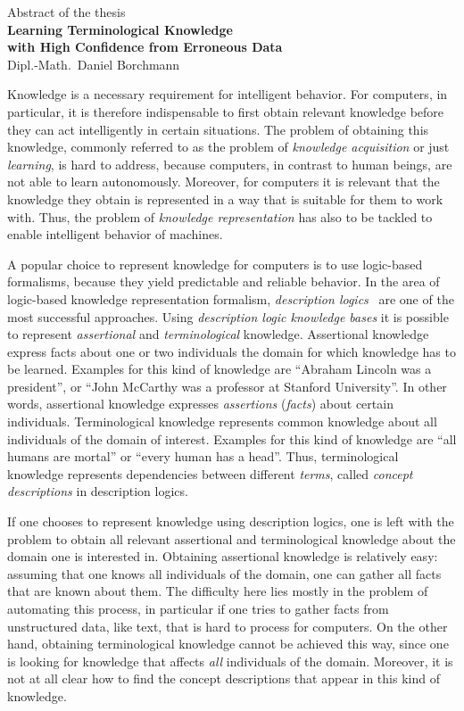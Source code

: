 \documentclass[english,fleqn]{scrartcl}
\begin{document}
\medskip
\begin{center}
  \normalsize Abstract of the thesis\\
  \LARGE\textbf{Learning Terminological Knowledge\\ with High Confidence from Erroneous
    Data}\\
  \bigskip%
  \large Dipl.-Math.\ Daniel Borchmann
\end{center}
\bigskip
\bigskip

\noindent
Knowledge is a necessary requirement for intelligent behavior.  For computers, in
particular, it is therefore indispensable to first obtain relevant knowledge before they
can act intelligently in certain situations.  The problem of obtaining this knowledge,
commonly referred to as the problem of \emph{knowledge acquisition} or just
\emph{learning}, is hard to address, because computers, in contrast to human beings, are
not able to learn autonomously.  Moreover, for computers it is relevant that the knowledge
they obtain is represented in a way that is suitable for them to work with.  Thus, the
problem of \emph{knowledge representation} has also to be tackled to enable intelligent
behavior of machines.

A popular choice to represent knowledge for computers is to use logic-based formalisms,
because they yield predictable and reliable behavior.  In the area of logic-based
knowledge representation formalism, \emph{description logics}~\cite{DLhandbook} are one of
the most successful approaches.  Using \emph{description logic knowledge bases} it is
possible to represent \emph{assertional} and \emph{terminological} knowledge.  Assertional
knowledge express facts about one or two individuals the domain for which knowledge has to
be learned.  Examples for this kind of knowledge are \enquote{Abraham Lincoln was a
  president}, or \enquote{John McCarthy was a professor at Stanford University}.  In other
words, assertional knowledge expresses \emph{assertions} (\emph{facts}) about certain
individuals.  Terminological knowledge represents common knowledge about all individuals
of the domain of interest.  Examples for this kind of knowledge are \enquote{all humans
  are mortal} or \enquote{every human has a head}.  Thus, terminological knowledge
represents dependencies between different \emph{terms}, called \emph{concept
  descriptions} in description logics.

If one chooses to represent knowledge using description logics, one is left with the
problem to obtain all relevant assertional and terminological knowledge about the domain
one is interested in.  Obtaining assertional knowledge is relatively easy: assuming that
one knows all individuals of the domain, one can gather all facts that are known about
them.  The difficulty here lies mostly in the problem of automating this process, in
particular if one tries to gather facts from unstructured data, like text, that is hard to
process for computers.  On the other hand, obtaining terminological knowledge cannot be
achieved this way, since one is looking for knowledge that affects \emph{all} individuals
of the domain.  Moreover, it is not at all clear how to find the concept descriptions that
appear in this kind of knowledge.
\end{document}
